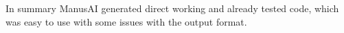 \documentclass[fontsize=11pt, paper=a4, pagesize=auto]{scrreprt}
\begin{document}
	In summary ManusAI generated direct working and already tested code, which was easy to use with some issues with the output format.

\begin{flushleft}
	\printbibliography[heading=bibintoc]
\end{flushleft}

% 
\end{document}
